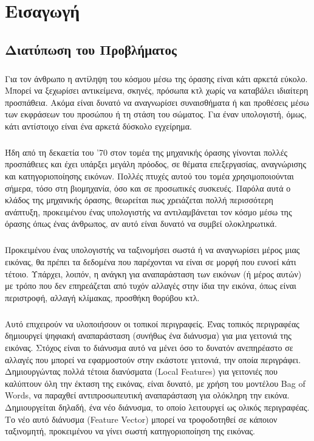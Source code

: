 \chapter{Εισαγωγή}

\section{Διατύπωση του Προβλήματος}
\paragraph*{}
Για τον άνθρωπο η αντίληψη του κόσμου μέσω της όρασης είναι κάτι αρκετά εύκολο. Μπορεί να ξεχωρίσει αντικείμενα, σκηνές, πρόσωπα κτλ χωρίς να καταβάλει ιδιαίτερη προσπάθεια. Ακόμα είναι δυνατό να αναγνωρίσει συναισθήματα ή και προθέσεις μέσω των εκφράσεων του προσώπου ή τη στάση του σώματος. Για έναν υπολογιστή, όμως, κάτι αντίστοιχο είναι ένα αρκετά δύσκολο εγχείρημα.

\paragraph*{}
Ήδη από τη δεκαετία του '70 στον τομέα της μηχανικής όρασης γίνονται πολλές προσπάθειες και έχει υπάρξει μεγάλη πρόοδος, σε θέματα επεξεργασίας, αναγνώρισης και κατηγοριοποίησης εικόνων. Πολλές πτυχές αυτού του τομέα χρησιμοποιούνται σήμερα, τόσο στη βιομηχανία, όσο και σε προσωπικές συσκευές. Παρόλα αυτά ο κλάδος της μηχανικής όρασης, θεωρείται πως χρειάζεται πολλή περισσότερη ανάπτυξη, προκειμένου ένας υπολογιστής να αντιλαμβάνεται τον κόσμο μέσω της όρασης όπως ένας άνθρωπος, αν αυτό είναι δυνατό να συμβεί ολοκληρωτικά.

\paragraph*{}
Προκειμένου ένας υπολογιστής να ταξινομήσει σωστά ή να αναγνωρίσει μέρος μιας εικόνας, θα πρέπει τα δεδομένα που παρέχονται να είναι σε μορφή που ευνοεί κάτι τέτοιο. Υπάρχει, λοιπόν, η ανάγκη για αναπαράσταση των εικόνων (ή μέρος αυτών) με τρόπο που δεν επηρεάζεται από τυχόν αλλαγές στην ίδια την εικόνα, όπως είναι περιστροφή, αλλαγή κλίμακας, προσθήκη θορύβου κτλ.
\paragraph*{}
Αυτό επιχειρούν να υλοποιήσουν οι τοπικοί περιγραφείς. Ένας τοπικός περιγραφέας δημιουργεί ψηφιακή αναπαράσταση (συνήθως ένα διάνυσμα) για μια γειτονιά της εικόνας. Στόχος είναι το διάνυσμα αυτό να μένει όσο το δυνατόν ανεπηρέαστο σε αλλαγές που μπορεί να εφαρμοστούν στην εκάστοτε γειτονιά, την οποία περιγράφει. Δημιουργώντας πολλά τέτοια διανύσματα (Local Features) για γειτονιές που καλύπτουν όλη την έκταση της εικόνας, είναι δυνατό, με χρήση του μοντέλου Bag of Words, να παραχθεί αντιπροσωπευτική αναπαράσταση για ολόκληρη την εικόνα. Δημιουργείται δηλαδή, ένα νέο διάνυσμα, το οποίο λειτουργεί ως ολικός περιγραφέας. Το νέο αυτό διάνυσμα (Feature Vector) μπορεί να τροφοδοτηθεί σε κάποιον ταξινομητή, προκειμένου να γίνει σωστή κατηγοριοποίηση της εικόνας.

